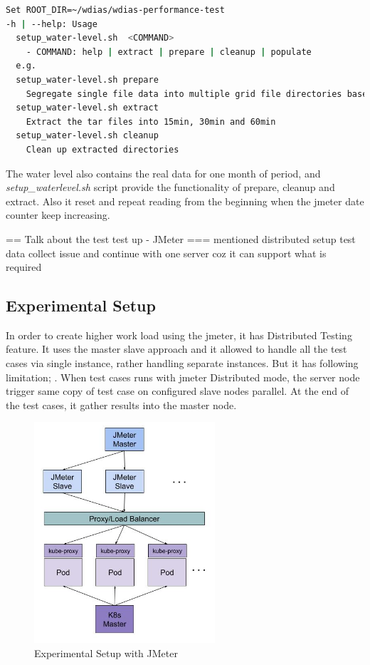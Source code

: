 \begin{lstlisting}[language=sh, caption=Water level Data Preparation]
Set ROOT_DIR=~/wdias/wdias-performance-test
-h | --help: Usage
  setup_water-level.sh  <COMMAND>
    - COMMAND: help | extract | prepare | cleanup | populate
  e.g.
  setup_water-level.sh prepare
    Segregate single file data into multiple grid file directories based on date. And Separate into main directories of 15min, 30min, 60min and create tar files
  setup_water-level.sh extract
    Extract the tar files into 15min, 30min and 60min
  setup_water-level.sh cleanup
    Clean up extracted directories
\end{lstlisting}
The water level also contains the real data for one month of period, and \emph{setup\_waterlevel.sh} script provide the functionality of prepare, cleanup and extract.
Also it reset and repeat reading from the beginning when the \acrshort{jmeter} date counter keep increasing.

== Talk about the test test up - JMeter
=== mentioned distributed setup test data collect issue and continue with one server coz it can support what is required
\subsection{Experimental Setup}
In order to create higher work load using the \acrshort{jmeter}, it has Distributed Testing feature. It uses the master slave approach and it allowed to handle all the test cases via single instance, rather handling separate instances. But it has following limitation;
. When test cases runs with \acrshort{jmeter} Distributed mode, the server node trigger same copy of test case on configured slave nodes parallel. At the end of the test cases, it gather results into the master node.

\begin{figure}[htp]
    \centering
    \includegraphics[width=0.6\textwidth]{results/work_load/experimental_setup_v3.jpg}
    \caption{Experimental Setup with JMeter}
    \label{fi:experimental_setup}
\end{figure}

